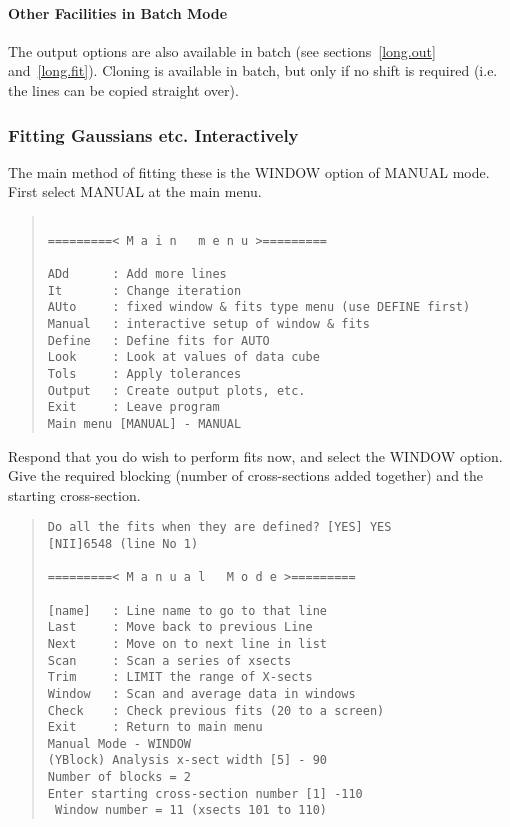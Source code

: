 \paragraph{Other Facilities in Batch Mode}

The output options are also available in batch (see
sections~\ref{long.out} and~\ref{long.fit}).
Cloning is available in batch, but only if no shift is required (i.e.
the lines can be copied straight over).

\subsubsection{Fitting Gaussians etc. Interactively}

The main method of fitting these is the WINDOW option of MANUAL mode.
First select MANUAL at the main menu.
\begin{quote}\begin{verbatim}
 
=========< M a i n   m e n u >=========
 
ADd      : Add more lines
It       : Change iteration
AUto     : fixed window & fits type menu (use DEFINE first)
Manual   : interactive setup of window & fits
Define   : Define fits for AUTO
Look     : Look at values of data cube
Tols     : Apply tolerances
Output   : Create output plots, etc.
Exit     : Leave program
Main menu [MANUAL] - MANUAL
\end{verbatim}\end{quote}
Respond that you do wish to perform fits now, and select the WINDOW
option. Give the required blocking (number of cross-sections added
together) and the starting cross-section.
\begin{quote}\begin{verbatim}
Do all the fits when they are defined? [YES] YES
[NII]6548 (line No 1)
 
=========< M a n u a l   M o d e >=========
 
[name]   : Line name to go to that line
Last     : Move back to previous Line
Next     : Move on to next line in list
Scan     : Scan a series of xsects
Trim     : LIMIT the range of X-sects
Window   : Scan and average data in windows
Check    : Check previous fits (20 to a screen)
Exit     : Return to main menu
Manual Mode - WINDOW
(YBlock) Analysis x-sect width [5] - 90
Number of blocks = 2
Enter starting cross-section number [1] -110
 Window number = 11 (xsects 101 to 110)
\end{verbatim}\end{quote}
